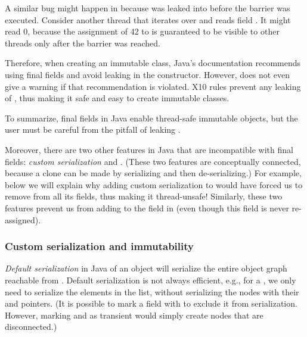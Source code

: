 A similar bug might happen in 
    because \this was leaked into  before the barrier was executed.
Consider another thread that iterates over  and reads field .
It might read 0, because the assignment of 42 to  is guaranteed to be visible to other threads
    only after the barrier was reached.

Therefore, when creating an immutable class,
    Java's documentation recommends using final fields
    and avoid leaking \this in the constructor.
However,  does not even give a warning if that recommendation is violated.
X10 rules prevent any leaking of \this,
    thus making it safe and easy to create immutable classes.

To summarize, final fields in Java
    enable thread-safe immutable objects,
    but the user must be careful from the pitfall of leaking \this.

Moreover, there are two other features in Java that are incompatible with {final} fields:
    \emph{custom serialization} and .
(These two features are conceptually connected,
    because a clone can be made by serializing and then de-serializing.)
For example, below we will explain why adding custom serialization to 
    would have forced us to remove  from all its fields,
    thus making it thread-unsafe!
Similarly, these two features prevent us from adding  to the 
    field in 
    (even though this field is never re-assigned).


\subsubsection{Custom serialization and immutability}
\emph{Default serialization} in Java of an object 
    will serialize the entire object graph reachable from .
Default serialization is not always efficient, e.g.,
    for a , we only need to serialize the elements in the list,
    without serializing the nodes with their  and  pointers.
(It is possible to mark a field with  to exclude it from serialization.
    However, marking  and  as transient would simply create nodes
        that are disconnected.)


